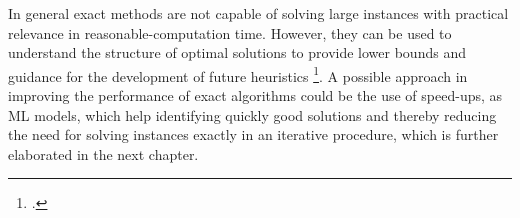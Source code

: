\parbreak

In general exact methods are not capable of solving large instances with practical relevance
in reasonable-computation time. However, they can be used to understand the structure
of optimal solutions to provide lower bounds and guidance for the development of future
heuristics \footcite[cf.][p.2]{tamke_branch-and-cut_2024}. A possible approach in improving
the performance of exact algorithms could be the use of speed-ups, as \gls{ML} models, which
help identifying quickly good solutions and thereby reducing the need for solving instances
exactly in an iterative procedure, which is further elaborated in the next chapter.
